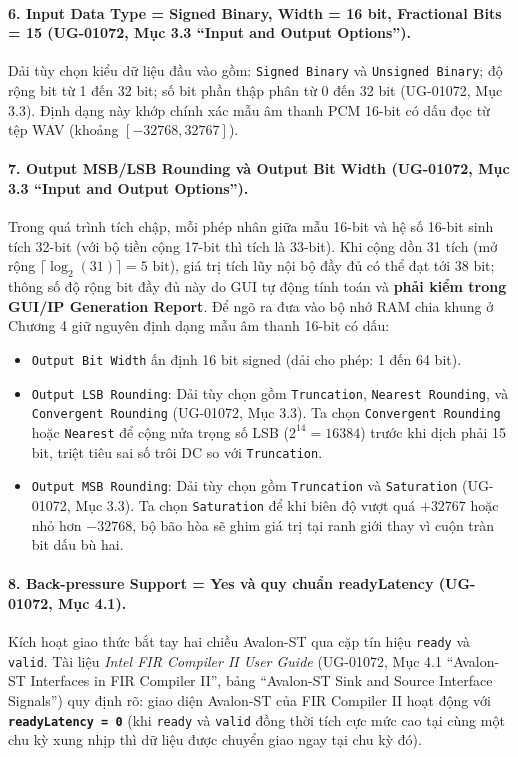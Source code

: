 \paragraph{6. Input Data Type = Signed Binary, Width = 16 bit, Fractional Bits = 15 (UG-01072, Mục 3.3 ``Input and Output Options'').}
Dải tùy chọn kiểu dữ liệu đầu vào gồm: \texttt{Signed Binary} và \texttt{Unsigned Binary}; độ rộng bit từ 1 đến 32 bit; số bit phần thập phân từ 0 đến 32 bit (UG-01072, Mục 3.3). Định dạng này khớp chính xác mẫu âm thanh PCM 16-bit có dấu đọc từ tệp WAV (khoảng $[-32768, 32767]$).

\paragraph{7. Output MSB/LSB Rounding và Output Bit Width (UG-01072, Mục 3.3 ``Input and Output Options'').}
Trong quá trình tích chập, mỗi phép nhân giữa mẫu 16-bit và hệ số 16-bit sinh tích 32-bit (với bộ tiền cộng 17-bit thì tích là 33-bit). Khi cộng dồn 31 tích (mở rộng $\lceil \log_2(31) \rceil = 5\text{ bit}$), giá trị tích lũy nội bộ đầy đủ có thể đạt tới 38 bit; thông số độ rộng bit đầy đủ này do GUI tự động tính toán và \textbf{phải kiểm trong GUI/IP Generation Report}.
Để ngõ ra đưa vào bộ nhớ RAM chia khung ở Chương 4 giữ nguyên định dạng mẫu âm thanh 16-bit có dấu:
\begin{itemize}[leftmargin=1.5em, itemsep=2pt]
    \item \texttt{Output Bit Width} ấn định 16 bit signed (dải cho phép: 1 đến 64 bit).
    \item \texttt{Output LSB Rounding}: Dải tùy chọn gồm \texttt{Truncation}, \texttt{Nearest Rounding}, và \texttt{Convergent Rounding} (UG-01072, Mục 3.3). Ta chọn \texttt{Convergent Rounding} hoặc \texttt{Nearest} để cộng nửa trọng số LSB ($2^{14} = 16384$) trước khi dịch phải 15 bit, triệt tiêu sai số trôi DC so với \texttt{Truncation}.
    \item \texttt{Output MSB Rounding}: Dải tùy chọn gồm \texttt{Truncation} và \texttt{Saturation} (UG-01072, Mục 3.3). Ta chọn \texttt{Saturation} để khi biên độ vượt quá $+32767$ hoặc nhỏ hơn $-32768$, bộ bão hòa sẽ ghim giá trị tại ranh giới thay vì cuộn tràn bit dấu bù hai.
\end{itemize}

\paragraph{8. Back-pressure Support = Yes và quy chuẩn readyLatency (UG-01072, Mục 4.1).}
Kích hoạt giao thức bắt tay hai chiều Avalon-ST qua cặp tín hiệu \texttt{ready} và \texttt{valid}. Tài liệu \emph{Intel FIR Compiler II User Guide} (UG-01072, Mục 4.1 ``Avalon-ST Interfaces in FIR Compiler II'', bảng ``Avalon-ST Sink and Source Interface Signals'') quy định rõ: giao diện Avalon-ST của FIR Compiler II hoạt động với \textbf{\texttt{readyLatency = 0}} (khi \texttt{ready} và \texttt{valid} đồng thời tích cực mức cao tại cùng một chu kỳ xung nhịp thì dữ liệu được chuyển giao ngay tại chu kỳ đó).


